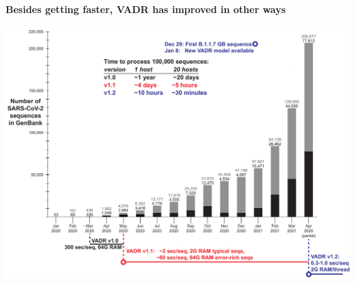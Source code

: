 \documentclass[landscape]{slides}
\begin{document}
%
%
\begin{slide}
\begin{center}
\textbf{Besides getting faster, VADR has improved in other ways}

\includegraphics[width=10.25in]{figs/sars-counts-jan2020-apr2021-slide4}

\end{center}

\vfill
\end{slide}
\end{document}
